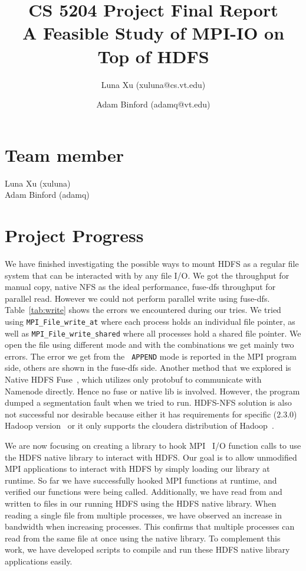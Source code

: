 \documentclass[11pt,titlepage]{article}
\author{Luna Xu (xuluna@cs.vt.edu) \and Adam Binford (adamq@vt.edu)}
\title{CS 5204 Project Final Report \\ A Feasible Study of MPI-IO on Top of HDFS}
\begin{document}
\maketitle

\section{Team member}
Luna Xu (xuluna)\\
Adam Binford (adamq)






\section{Project Progress}
We have finished investigating the possible ways to mount HDFS as a regular
file system that can be interacted with by any file I/O. 
We got the throughput for manual copy, native NFS as the ideal performance,
fuse-dfs throughput for parallel read. However we could not perform parallel
write using fuse-dfs. Table~\ref{tab:write} shows the errors we encountered during our
tries. We tried using {\tt MPI\_File\_write\_at} where each process holds an
individual file pointer, as well as {\tt MPI\_File\_write\_shared} where all
processes hold a shared file pointer. We open the file using different mode and
with the combinations we get mainly two errors. The error we get from the {\tt
APPEND} mode is reported in the MPI program side, others are shown in the
fuse-dfs side. Another method that we explored is Native HDFS Fuse~\cite{native},
which utilizes only protobuf to communicate with Namenode directly. Hence no
fuse or native lib is involved. However, the program dumped a segmentation fault
when we tried to run. HDFS-NFS solution is also not successful nor
desirable because either it has requirements for specific (2.3.0) Hadoop
version~\cite{nfs} or it only supports the cloudera distribution of
Hadoop~\cite{proxy}.


We are now focusing on creating a library to 
hook MPI~\cite{mpich} I/O function calls to use the HDFS native library to interact with
HDFS. Our goal is to allow 
unmodified MPI applications to interact with HDFS by simply loading our library
at runtime. 
So far we have successfully hooked MPI functions at runtime, and verified our
functions were being 
called. Additionally, we have read from and written to files in our running HDFS
using the HDFS native 
library. When reading a single file from multiple processes, we have observed an
increase in bandwidth 
when increasing processes. This confirms that multiple processes can read from the
same file at once using 
the native library. To complement this work, we have developed scripts to
compile and run these HDFS 
native library applications easily.
\end{document}
